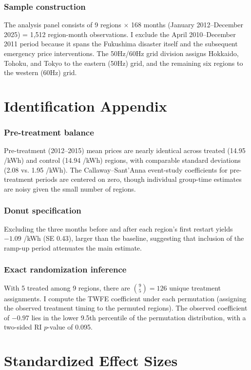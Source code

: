 \documentclass[12pt]{article}
\newcommand{\yen}{\textyen}
\begin{document}
\subsubsection*{Sample construction} The analysis panel consists of 9 regions $\times$ 168 months (January 2012--December 2025) = 1,512 region-month observations. I exclude the April 2010--December 2011 period because it spans the Fukushima disaster itself and the subsequent emergency price interventions. The 50Hz/60Hz grid division assigns Hokkaido, Tohoku, and Tokyo to the eastern (50Hz) grid, and the remaining six regions to the western (60Hz) grid.

\section{Identification Appendix}
\label{app:id}

\subsubsection*{Pre-treatment balance} Pre-treatment (2012--2015) mean prices are nearly identical across treated (14.95 \yen/kWh) and control (14.94 \yen/kWh) regions, with comparable standard deviations (2.08 vs. 1.95 \yen/kWh). The Callaway--Sant'Anna event-study coefficients for pre-treatment periods are centered on zero, though individual group-time estimates are noisy given the small number of regions.

\subsubsection*{Donut specification} Excluding the three months before and after each region's first restart yields $-1.09$ \yen/kWh (SE 0.43), larger than the baseline, suggesting that inclusion of the ramp-up period attenuates the main estimate.

\subsubsection*{Exact randomization inference} With 5 treated among 9 regions, there are $\binom{9}{5} = 126$ unique treatment assignments. I compute the TWFE coefficient under each permutation (assigning the observed treatment timing to the permuted regions). The observed coefficient of $-0.97$ lies in the lower 9.5th percentile of the permutation distribution, with a two-sided RI $p$-value of 0.095.


\section{Standardized Effect Sizes}
\label{sec:sde}


\end{document}
